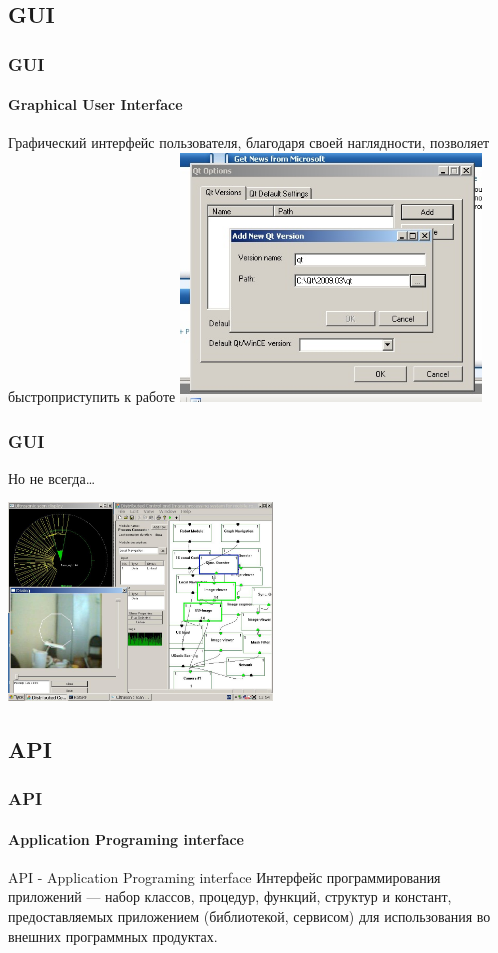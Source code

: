 \documentclass{beamer}
\begin{document}
\subsection{GUI}
\begin{frame}
\frametitle{GUI}
\framesubtitle{Graphical User Interface}
Графический интерфейс пользователя, благодаря своей наглядности, позволяет
быстроприступить к работе
\includegraphics[width=8cm]{button.jpg}
\end{frame}

\begin{frame}
\frametitle{GUI}
Но не всегда\ldots


\includegraphics[width=7cm]{hell.jpg}
\end{frame}


\subsection{API}
\begin{frame}
\frametitle{API}
\framesubtitle{Application Programing interface}
API - Application Programing interface
Интерфейс программирования приложений — набор  классов, процедур, функций, структур и констант, предоставляемых приложением (библиотекой, сервисом) для использования во внешних программных продуктах. 

\end{frame}
\end{document}
